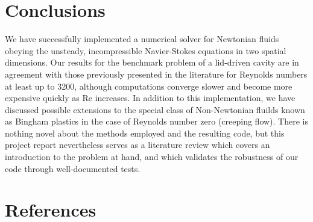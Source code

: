 \documentclass[final,3p,twocolumn]{elsarticle}
\begin{document}
\section{Conclusions}
\label{sec:conclusion}

We have successfully implemented a numerical solver for Newtonian fluids
obeying the unsteady, incompressible Navier-Stokes equations in two spatial
dimensions. Our results for the benchmark problem of a lid-driven cavity are in
agreement with those previously presented in the literature for Reynolds
numbers at least up to 3200, although computations converge slower and become
more expensive quickly as Re increases.  In addition to this implementation, we
have discussed possible extensions to the special class of Non-Newtonian
fluilds known as Bingham plastics in the case of Reynolds number zero (creeping
flow). There is nothing novel about the methods employed and the resulting
code, but this project report nevertheless serves as a literature review which
covers an introduction to the problem at hand, and which validates the
robustness of our code through well-documented tests. 

\section*{References}


\end{document}
